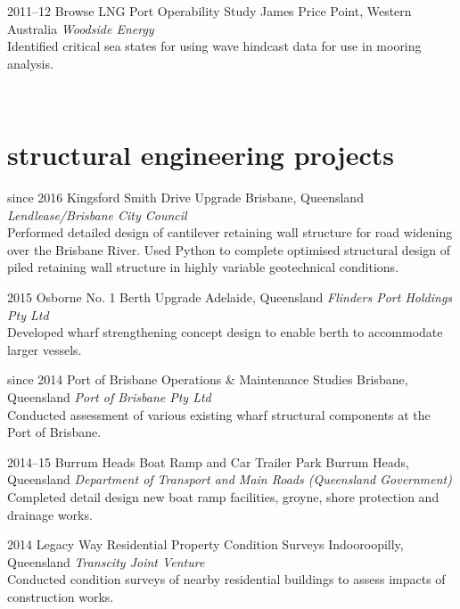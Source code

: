 \begin{entrylist}
\entry%
{2011--12}
{Browse LNG Port Operability Study}
{James Price Point, Western Australia}
{\emph{Woodside Energy} \\
Identified critical sea states for using wave hindcast data for use in mooring analysis.}
\end{entrylist}
\\


\section{ structural engineering projects}

\begin{entrylist}
\entry%
{since 2016}
{Kingsford Smith Drive Upgrade}
{Brisbane, Queensland}
{\emph{Lendlease/Brisbane City Council} \\
Performed detailed design of cantilever retaining wall structure for road widening over the Brisbane River. Used Python to complete optimised structural design of piled retaining wall structure in highly variable geotechnical conditions.
}
\end{entrylist}

\begin{entrylist}
\entry%
{2015}
{Osborne No. 1 Berth Upgrade}
{Adelaide, Queensland}
{\emph{Flinders Port Holdings Pty Ltd} \\
Developed wharf strengthening concept design to enable berth to accommodate larger vessels.}
\end{entrylist}

\begin{entrylist}
\entry%
{since 2014}
{Port of Brisbane Operations \& Maintenance Studies}
{Brisbane, Queensland}
{\emph{Port of Brisbane Pty Ltd} \\
Conducted assessment of various existing wharf structural components at the Port of Brisbane.}
\end{entrylist}

\begin{entrylist}
\entry%
{2014--15}
{Burrum Heads Boat Ramp and Car Trailer Park}
{Burrum Heads, Queensland}
{\emph{Department of Transport and Main Roads (Queensland Government)} \\
Completed detail design new boat ramp facilities, groyne, shore protection and drainage works.}
\end{entrylist}

\begin{entrylist}
\entry%
{2014}
{Legacy Way Residential Property Condition Surveys}
{Indooroopilly, Queensland}
{\emph{Transcity Joint Venture} \\
Conducted condition surveys of nearby residential buildings to assess impacts of construction works.}
\end{entrylist}


